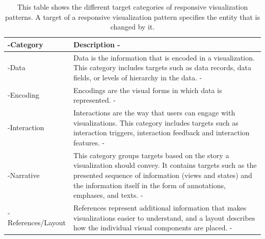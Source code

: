 \begin{table}[tp]
\tablestretch
{}
\centering
\begin{tabularx}{\linewidth}{>{\kern-\tabcolsep}lX<{\kern-\tabcolsep}}
\toprule
Category & Description \\
\midrule
Data & Data is the information that is encoded in a visualization. This category includes targets such as data records, data fields, or levels of hierarchy in the data. \\
Encoding & Encodings are the visual forms in which data is represented. \\
Interaction & Interactions are the way that users can engage with visualizations. This category includes targets such as interaction triggers, interaction feedback and interaction features. \\
Narrative & This category groups targets based on the story a visualization should convey. It contains targets such as the presented sequence of information (views and states) and the information itself in the form of annotations, emphases, and texts. \\
References/Layout & References represent additional information that makes visualizations easier to understand, and a layout describes how the individual visual components are placed. \\
\bottomrule
\end{tabularx}
\caption[Targets of Responsive Visualization Patterns]{
  This table shows the different target categories of responsive visualization patterns. 
  A target of a responsive visualization pattern specifies the entity that is changed by it.
}
\label{tab:PatternsTargets}
\end{table}

